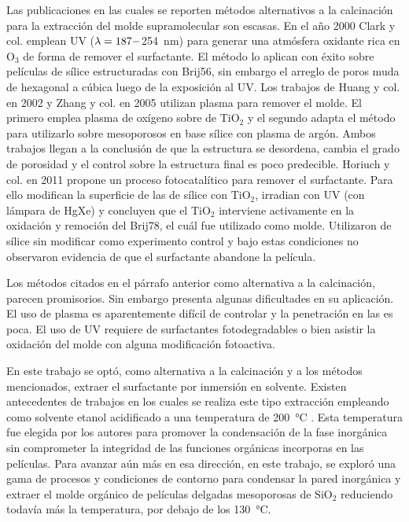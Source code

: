 	Las publicaciones en las cuales se reporten métodos alternativos a la calcinación para la extracción del molde supramolecular son escasas. En el año 2000 Clark y col.\cite{Clark2000} emplean UV ($\lambda\index{longitud de onda}=187-$\SI{254}{\nm}) para generar una atmósfera oxidante rica en O$_3$ de forma de remover el surfactante. El método lo aplican con éxito sobre películas de sílice estructuradas con Brij56, sin embargo el arreglo de poros muda de hexagonal a cúbica luego de la exposición al UV. Los trabajos de Huang y col. en 2002\cite{Huang2002} y Zhang y col. en 2005\cite{Zhang2005} utilizan plasma para remover el molde. El primero emplea plasma de oxígeno sobre \pdm\space de TiO$_2$ y el segundo adapta el método para utilizarlo sobre mesoporosos en base sílice con plasma de argón. Ambos trabajos llegan a la conclusión de que la estructura se desordena, cambia el grado de porosidad y el control sobre la estructura final es poco predecible. Horiuch y col.\cite{Horiuchi2011} en 2011 propone un proceso fotocatalítico para remover el surfactante. Para ello modifican la superficie de las \pdm\space de sílice con TiO$_2$, irradian con UV (con lámpara de HgXe) y concluyen que el TiO$_2$ interviene activamente en la oxidación y remoción del Brij78, el cuál fue utilizado como molde. Utilizaron \pdm\space de sílice sin modificar como experimento control y bajo estas condiciones no observaron evidencia de que el surfactante abandone la película.

	Los métodos citados en el párrafo anterior como alternativa a la calcinación, parecen promisorios. Sin embargo presenta algunas dificultades en su aplicación. El uso de plasma es aparentemente difícil de controlar y la penetración en las \pdm\space es poca. El uso de UV requiere de surfactantes fotodegradables o bien asistir la oxidación del molde con alguna modificación fotoactiva.

	En este trabajo se optó, como alternativa a la calcinación y a los métodos mencionados, extraer el surfactante por inmersión en solvente. Existen antecedentes de trabajos en los cuales se realiza este tipo extracción empleando como solvente etanol acidificado a una temperatura de \SI{200}{\celsius} \cite{Angelome2008,Calvo20210,Calvo2010,Fuertes2009}. Esta temperatura fue elegida por los autores para promover la condensación de la fase inorgánica sin comprometer la integridad de las funciones orgánicas incorporas en las películas. Para avanzar aún más en esa dirección, en este trabajo, se exploró una gama de procesos y condiciones de contorno para condensar la pared inorgánica y extraer el molde orgánico de películas delgadas mesoporosas de SiO$_2$ reduciendo todavía más la temperatura, por debajo de los \SI{130}{\celsius}.

